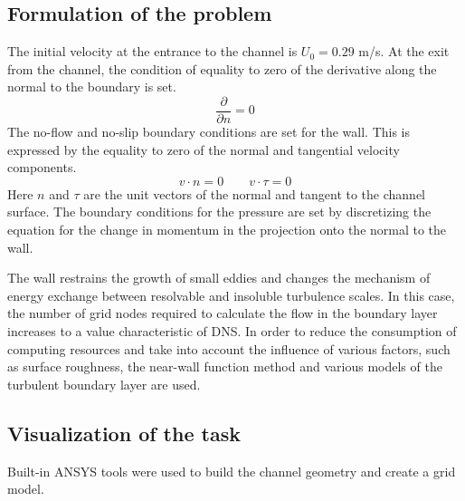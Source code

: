 \subsection{Formulation of the problem}
	The initial velocity at the entrance to the channel is $U_0 = 0.29$ m/s.
	At the exit from the channel, the condition of equality to zero of the derivative along the normal to the boundary is set.
	\begin{equation}
		\frac{\partial}{\partial n} = 0
	\end{equation}
	The no-flow and no-slip boundary conditions are set for the wall. This is expressed by the equality to zero of the normal and tangential velocity components.
	\begin{equation}
		v \cdot n = 0 \qquad v \cdot \tau = 0
	\end{equation}
	Here $n$ and $\tau$ are the unit vectors of the normal and tangent to the channel surface. The boundary conditions for the pressure are set by discretizing the equation for the change in momentum in the projection onto the normal to the wall.
	
	The wall restrains the growth of small eddies and changes the mechanism of energy exchange between resolvable and insoluble turbulence scales. In this case, the number of grid nodes required to calculate the flow in the boundary layer increases to a value characteristic of DNS. In order to reduce the consumption of computing resources and take into account the influence of various factors, such as surface roughness, the near-wall function method and various models of the turbulent boundary layer are used\cite{Cabot2000}.
\subsection{Visualization of the task}
	Built-in ANSYS tools were used to build the channel geometry and create a grid model.

